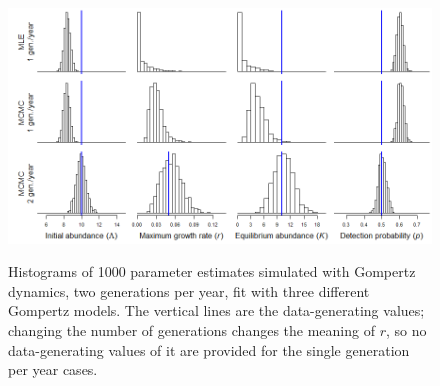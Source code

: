 \documentclass{article}
\begin{document}
\begin{figure}
\caption{Histograms of 1000 parameter estimates simulated with Gompertz dynamics, 
two generations per year, fit with three different Gompertz models.
The vertical lines are the data-generating values; changing the number of generations
changes the meaning of $r$, so no data-generating values of it are provided for the 
single generation per year cases.}
  \centering
  \includegraphics{../figs/gomp_hists}
\label{fig:gomp_hists}
\end{figure}
\end{document}
